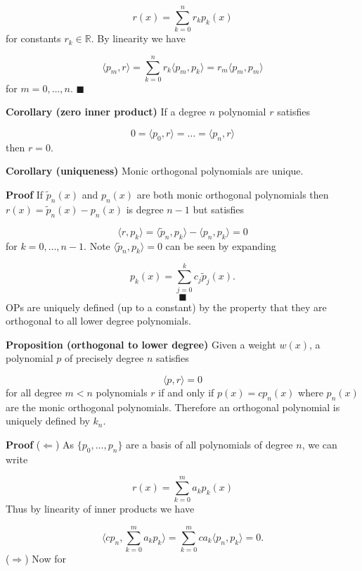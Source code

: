 \documentclass[12pt,a4paper]{article}
\def\bbR{ {\mathbb R} }
\begin{document}
\[
r(x) = \ensuremath{\sum}_{k=0}^n r_k p_k(x)
\]
for constants $r_k \ensuremath{\in} \ensuremath{\bbR}$. By linearity we have

\[
\ensuremath{\langle}p_m,r\ensuremath{\rangle} = \ensuremath{\sum}_{k=0}^n r_k \ensuremath{\langle}p_m,p_k\ensuremath{\rangle}= r_m \ensuremath{\langle}p_m,p_m\ensuremath{\rangle}
\]
for $m = 0, \ldots, n$. $\blacksquare$

\textbf{Corollary (zero inner product)} If a degree $n$ polynomial $r$ satisfies

\[
0 = \ensuremath{\langle}p_0,r\ensuremath{\rangle} = \ensuremath{\ldots} = \ensuremath{\langle}p_n,r\ensuremath{\rangle}
\]
then $r = 0$.

\textbf{Corollary (uniqueness)} Monic orthogonal polynomials are unique.

\textbf{Proof} If $\widetilde{p}_n(x)$ and $p_n(x)$ are both monic orthogonal polynomials then $r(x) = \widetilde{p}_n(x) - p_n(x)$ is degree $n-1$ but satisfies

\[
\ensuremath{\langle}r, p_k\ensuremath{\rangle} = \ensuremath{\langle}\widetilde{p}_n, p_k\ensuremath{\rangle} - \ensuremath{\langle}p_n, p_k\ensuremath{\rangle} = 0
\]
for $k = 0,\ensuremath{\ldots},{n-1}$. Note $\ensuremath{\langle}\widetilde{p}_n, p_k\ensuremath{\rangle} = 0$ can be seen by expanding

\[
p_k(x) = \ensuremath{\sum}_{j=0}^k c_j \widetilde{p}_j(x).
\]
\[
\blacksquare
\]
OPs are uniquely defined (up to a constant) by the property that they are orthogonal to all lower degree polynomials.

\textbf{Proposition (orthogonal to lower degree)} Given a weight $w(x)$,  a polynomial $p$ of precisely degree $n$ satisfies

\[
\ensuremath{\langle}p,r\ensuremath{\rangle} = 0
\]
for all degree $m < n$ polynomials $r$ if and only if $p(x) = c p_n(x)$ where $p_n(x)$ are the monic orthogonal polynomials. Therefore an orthogonal polynomial is uniquely defined by $k_n$.

\textbf{Proof} ($\Leftarrow$) As $\{p_0,\ensuremath{\ldots},p_n\}$ are a basis of all polynomials of degree $n$, we can write

\[
r(x) = \ensuremath{\sum}_{k=0}^m a_k p_k(x)
\]
Thus by linearity of inner products we have

\[
\ensuremath{\langle}cp_n,\ensuremath{\sum}_{k=0}^m a_k p_k\ensuremath{\rangle} = \ensuremath{\sum}_{k=0}^m ca_k \ensuremath{\langle}p_n, p_k\ensuremath{\rangle} = 0.
\]
($\Rightarrow$) Now for
\end{document}
